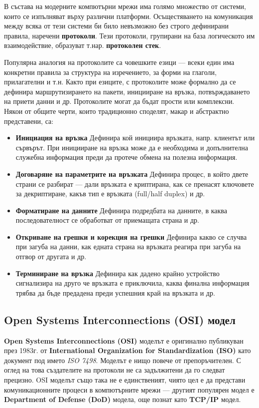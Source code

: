 \documentclass[12pt,a4paper,oneside]{book}
\begin{document}
В състава на модерните компютърни мрежи има голямо множество от системи, които
се изпълняват върху различни платформи. Осъщестяването на комуникация между
всяка от тези системи би било невъзможно без строго дефинирани правила, наречени
\textbf{протоколи}. Тези протоколи, групирани на база логическото им
взаимодействие, образуват т.нар. \textbf{протоколен стек}.

Популярна аналогия на протоколите са човешките езици --- всеки един има конкретни
правила за структура на изречението, за форми на глаголи, прилагателни и т.н.
Както при езиците, с протоколите може формално да се дефинира
маршрутизирането на пакети, иницииране на връзка, потвърждаването на приети
данни и др. Протоколите могат да бъдат прости или комплексни. Някои от общите
черти, които традиционно споделят, макар и абстрактно представени, са:

\begin{itemize}
  \item \textbf{Инициация на връзка} Дефинира кой инициира връзката, напр.
    клиентът или сървърът. При иницииране на връзка може да е необходима и
    допълнителна служебна информация преди да протече обмена на полезна
    информация.
  \item \textbf{Договаряне на параметрите на връзката} Дефинира процес, в който
    двете страни се разбират --- дали връзката е криптирана, как се пренасят
    ключовете за декриптиране, какъв тип е връзката (full/half duplex) и др.
  \item \textbf{Форматиране на данните} Дефинира подредбата на данните, в каква
    последователност се обработват от приемащата страна и др.
  \item \textbf{Откриване на грешки и корекция на грешки} Дефинира какво се
    случва при загуба на данни, как едната страна на връзката реагира при загуба
    на отгвор от другата и др.
  \item \textbf{Терминиране на връзка} Дефинира как дадено крайно устройство
    сигнализира на друго че връзката е приключила, каква финална информация
    трябва да бъде предадена преди успешния край на връзката и др.
\end{itemize}

\subsection{Open Systems Interconnections (OSI) модел}

\textbf{Open Systems Interconnections (OSI)} моделът е оригинално публикуван
през 1983г. от \textbf{International Organization for Standardization (ISO)}
като документ под името \textit{ISO 7498}. Моделът е нищо повече от
препоръчителен. С оглед на това създателите на протоколи не са задължитени да го
следват прецизно. OSI моделът също така не е единственият, чиято цел е да
представи комуникационните процеси в компютърните мрежи --- другият популярен
модел е \textbf{Department of Defense (DoD)} модела, още познат като
\textbf{TCP/IP} модел.
\end{document}
